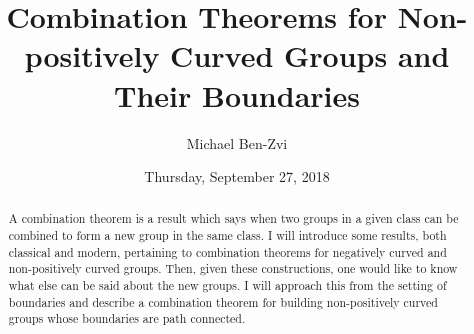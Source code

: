 \documentclass{UAmathtalk}
\author{Michael Ben-Zvi}
\title{Combination Theorems for Non-positively Curved Groups and Their Boundaries}
\date{Thursday, September 27, 2018}
\begin{document}
\maketitle

\begin{abstract}
A combination theorem is a result which says when two groups in a given class can be combined to form a new group in the same class. I will introduce some results, both classical and modern, pertaining to combination theorems for negatively curved and non-positively curved groups. Then, given these constructions, one would like to know what else can be said about the new groups. I will approach this from the setting of boundaries and describe a combination theorem for building non-positively curved groups whose boundaries are path connected.
\end{abstract}
\end{document}
